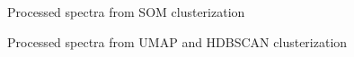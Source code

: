 \begin{figure}[!htbp]
  \centering
  
  \caption{Processed spectra from SOM clusterization}
  \label{fig:som-spectra}
\end{figure}

\begin{figure}[!htbp]
  \centering
  
  \caption{Processed spectra from UMAP and HDBSCAN clusterization}
  \label{fig:hdbscan-spectra}
\end{figure}